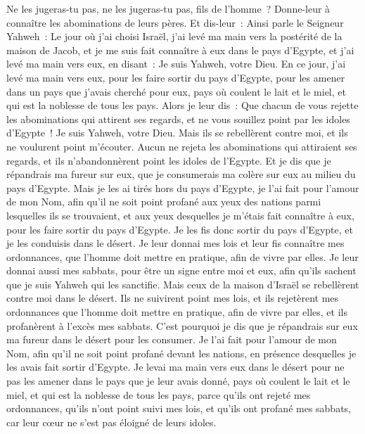 \begin{multicols}{2}
Ne les jugeras-tu pas, ne les jugeras-tu pas, fils de l'homme~? Donne-leur à connaître les abominations de leurs pères.
Et dis-leur~: Ainsi parle le Seigneur Yahweh~: Le jour où j'ai choisi Israël, j'ai levé ma main vers la postérité de la maison de Jacob, et je me suis fait connaître à eux dans le pays d'Egypte, et j'ai levé ma main vers eux, en disant~: Je suis Yahweh, votre Dieu.
En ce jour, j'ai levé ma main vers eux, pour les faire sortir du pays d'Egypte, pour les amener dans un pays que j'avais cherché pour eux, pays où coulent le lait et le miel, et qui est la noblesse de tous les pays.
Alors je leur dis~: Que chacun de vous rejette les abominations qui attirent ses regards, et ne vous souillez point par les idoles d'Egypte~! Je suis Yahweh, votre Dieu.
Mais ils se rebellèrent contre moi, et ils ne voulurent point m'écouter. Aucun ne rejeta les abominations qui attiraient ses regards, et ils n'abandonnèrent point les idoles de l'Egypte. Et je dis que je répandrais ma fureur sur eux, que je consumerais ma colère sur eux au milieu du pays d'Egypte.
Mais je les ai tirés hors du pays d'Egypte, je l'ai fait pour l'amour de mon Nom, afin qu'il ne soit point profané aux yeux des nations parmi lesquelles ils se trouvaient, et aux yeux desquelles je m'étais fait connaître à eux, pour les faire sortir du pays d'Egypte.
Je les fis donc sortir du pays d'Egypte, et je les conduisis dans le désert.
Je leur donnai mes lois et leur fis connaître mes ordonnances, que l'homme doit mettre en pratique, afin de vivre par elles.
Je leur donnai aussi mes sabbats, pour être un signe entre moi et eux, afin qu'ils sachent que je suis Yahweh qui les sanctifie.
Mais ceux de la maison d'Israël se rebellèrent contre moi dans le désert. Ils ne suivirent point mes lois, et ils rejetèrent mes ordonnances que l'homme doit mettre en pratique, afin de vivre par elles, et ils profanèrent à l'excès mes sabbats. C'est pourquoi je dis que je répandrais sur eux ma fureur dans le désert pour les consumer.
Je l'ai fait pour l'amour de mon Nom, afin qu'il ne soit point profané devant les nations, en présence desquelles je les avais fait sortir d'Egypte.
Je levai ma main vers eux dans le désert pour ne pas les amener dans le pays que je leur avais donné, pays où coulent le lait et le miel, et qui est la noblesse de tous les pays,
parce qu'ils ont rejeté mes ordonnances, qu'ils n'ont point suivi mes lois, et qu'ils ont profané mes sabbats, car leur cœur ne s'est pas éloigné de leurs idoles.

\end{multicols}
